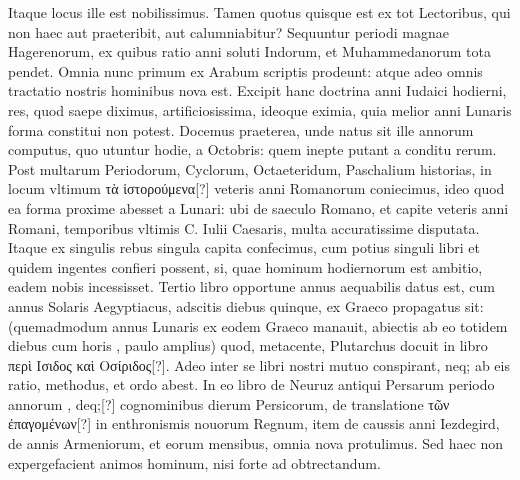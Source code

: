 Itaque locus ille est nobilissimus. 
Tamen quotus quisque est ex tot Lectoribus, qui non haec
 aut praeteribit,
aut calumniabitur?
Sequuntur periodi magnae Hagerenorum,
ex quibus ratio anni soluti Indorum, et Muhammedanorum
tota pendet.
Omnia nunc primum ex Arabum scriptis
prodeunt: atque adeo omnis tractatio nostris hominibus
nova est.
Excipit hanc doctrina anni Iudaici hodierni, res, quod
saepe diximus, artificiosissima, ideoque eximia, quia melior
anni Lunaris forma constitui non potest.
%
Docemus praeterea, unde
natus sit ille annorum computus, quo utuntur hodie, a  Octobris:
quem inepte putant a conditu rerum.
Post multarum Periodorum,
Cyclorum, Octaeteridum, Paschalium historias, in locum vltimum
\textgreek{τὰ ἱστορούμενα[?]} veteris anni Romanorum coniecimus, ideo
quod ea forma proxime abesset a Lunari: ubi de saeculo Romano,
et capite veteris anni Romani, temporibus vltimis C. Iulii Caesaris,
multa accuratissime disputata.
Itaque ex singulis rebus singula capita
confecimus, cum potius singuli libri et quidem ingentes confieri
possent, si, quae hominum hodiernorum est ambitio, eadem nobis
incessisset.
Tertio libro opportune annus aequabilis datus est,
cum annus Solaris Aegyptiacus, adscitis diebus quinque, ex Graeco
propagatus sit: (quemadmodum annus Lunaris ex eodem Graeco
manauit, abiectis ab eo totidem diebus cum horis , paulo amplius)
quod, metacente, Plutarchus docuit in libro
 \textgreek{περὶ Ισιδος καὶ Οσίριδος[?]}.
Adeo inter se libri nostri mutuo conspirant, neq; ab eis ratio,
methodus, et ordo abest.
In eo libro de Neuruz antiqui Persarum
periodo annorum , deq;[?] cognominibus dierum Persicorum,
de translatione \textgreek{τῶν ἐπαγομένων[?]} in enthronismis nouorum Regnum,
item de caussis anni Iezdegird, de annis Armeniorum, et eorum
mensibus, omnia nova protulimus. 
Sed haec non expergefacient animos
hominum, nisi forte ad obtrectandum.

